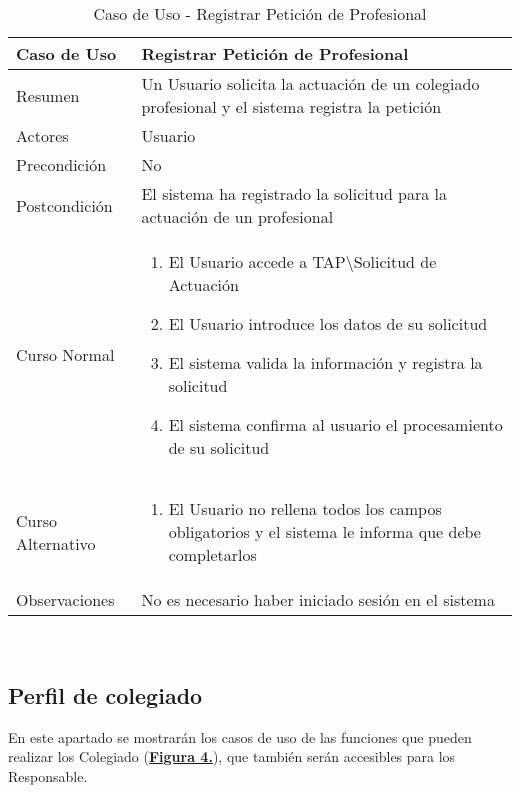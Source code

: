 \begin{table}[!htbp]
  \centering  \addtocounter{casouso}{1}
  \begin{tabular}{|l | p{100mm}|}
    \textbf{Caso de Uso}  & \textbf{Registrar Petición de Profesional} \\ \hline
    Resumen 		 & Un Usuario solicita la actuación de un colegiado profesional y el sistema registra la petición \\ \hline
    Actores  		 & Usuario \\ \hline
    Precondición  	 & No \\ \hline
    Postcondición  	 & El sistema ha registrado la solicitud para la actuación de un profesional \\ \hline
    Curso Normal   	 & \begin{enumerate}
	  \item El Usuario accede a TAP\textbackslash Solicitud de Actuación
	  \item El Usuario introduce los datos de su solicitud
	  \item El sistema valida la información y registra la solicitud
	  \item El sistema confirma al usuario el procesamiento de su solicitud
    \end{enumerate}  \\ \hline
    Curso Alternativo  & \begin{enumerate}
	  \item El Usuario no rellena todos los campos obligatorios y el sistema le informa que debe completarlos
    \end{enumerate}  \\ \hline
    Observaciones 	 & No es necesario haber iniciado sesión en el sistema  \\ \hline
  \end{tabular}
  \caption{Caso de Uso  - Registrar Petición de Profesional}
  \label{tab:cuuRegPeticProf}
\end{table}
\FloatBarrier

\newpage~
\subsection{Perfil de colegiado}

\addtocounter{figura_cap4}{1}
En este apartado se mostrarán los casos de uso de las funciones que pueden realizar los Colegiado (\textbf{\hyperref[fig:CasosDeUso_Colegiado]{Figura 4.}}), que también serán accesibles para los Responsable.

